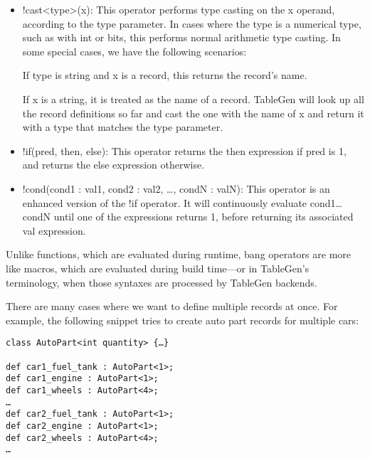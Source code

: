 \begin{itemize}
\item !cast<type>(x): This operator performs type casting on the x operand, according to the type parameter. In cases where the type is a numerical type, such as with int or bits, this performs normal arithmetic type casting. In some special cases, we have the following scenarios:

If type is string and x is a record, this returns the record's name.

If x is a string, it is treated as the name of a record. TableGen will look up all the record definitions so far and cast the one with the name of x and return it with a type that matches the type parameter.

\item !if(pred, then, else): This operator returns the then expression if pred is 1, and returns the else expression otherwise.
\item !cond(cond1 : val1, cond2 : val2, …, condN : valN): This operator is an enhanced version of the !if operator. It will continuously evaluate cond1…condN until one of the expressions returns 1, before returning its associated val expression.
\end{itemize}

\begin{tcolorbox}[colback=blue!5!white,colframe=blue!75!black, fonttitle=\bfseries,title=Note]
\hspace*{0.7cm}Unlike functions, which are evaluated during runtime, bang operators are more like macros, which are evaluated during build time—or in TableGen's terminology, when those syntaxes are processed by TableGen backends.
\end{tcolorbox}


There are many cases where we want to define multiple records at once. For example, the following snippet tries to create auto part records for multiple cars:

\begin{lstlisting}[style=styleCXX]
class AutoPart<int quantity> {…}

def car1_fuel_tank : AutoPart<1>;
def car1_engine : AutoPart<1>;
def car1_wheels : AutoPart<4>;
…
def car2_fuel_tank : AutoPart<1>;
def car2_engine : AutoPart<1>;
def car2_wheels : AutoPart<4>;
…
\end{lstlisting}

